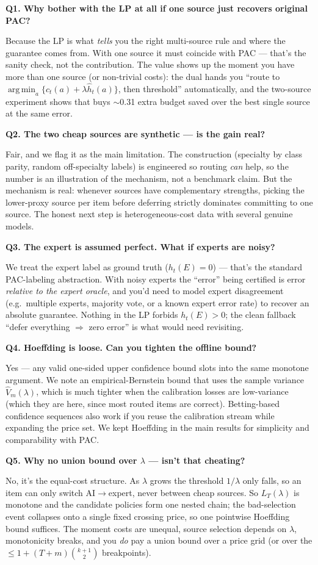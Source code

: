 \documentclass[11pt]{article}
\newcommand{\argmin}{\operatorname*{arg\,min}}
\newcommand{\hath}{\widehat h}
\newcommand{\qsection}[1]{%
  \par\vspace{0.7\baselineskip}%
  {\large\bfseries\color{blue!45!black}#1}\par
  \vspace{0.2\baselineskip}}
\begin{document}
\qsection{Q1. Why bother with the LP at all if one source just recovers original PAC?}
Because the LP is what \emph{tells} you the right multi-source rule and where the
guarantee comes from. With one source it must coincide with PAC --- that's the
sanity check, not the contribution. The value shows up the moment you have more
than one source (or non-trivial costs): the dual hands you ``route to
$\argmin_a\{c_t(a)+\lambda\hath_t(a)\}$, then threshold'' automatically, and the
two-source experiment shows that buys $\sim$0.31 extra budget saved over the best
single source at the same error.

\qsection{Q2. The two cheap sources are synthetic --- is the gain real?}
Fair, and we flag it as the main limitation. The construction (specialty by
class parity, random off-specialty labels) is engineered so routing \emph{can}
help, so the number is an illustration of the mechanism, not a benchmark claim.
But the mechanism is real: whenever sources have complementary strengths, picking
the lower-proxy source per item before deferring strictly dominates committing to
one source. The honest next step is heterogeneous-cost data with several genuine
models.

\qsection{Q3. The expert is assumed perfect. What if experts are noisy?}
We treat the expert label as ground truth ($h_t(E)=0$) --- that's the standard
PAC-labeling abstraction. With noisy experts the ``error'' being certified is
error \emph{relative to the expert oracle}, and you'd need to model expert
disagreement (e.g.\ multiple experts, majority vote, or a known expert error
rate) to recover an absolute guarantee. Nothing in the LP forbids $h_t(E)>0$;
the clean fallback ``defer everything $\Rightarrow$ zero error'' is what would
need revisiting.

\qsection{Q4. Hoeffding is loose. Can you tighten the offline bound?}
Yes --- any valid one-sided upper confidence bound slots into the same monotone
argument. We note an empirical-Bernstein bound that uses the sample variance
$\widehat V_m(\lambda)$, which is much tighter when the calibration losses are
low-variance (which they are here, since most routed items are correct).
Betting-based confidence sequences also work if you reuse the calibration stream
while expanding the price set. We kept Hoeffding in the main results for
simplicity and comparability with PAC.

\qsection{Q5. Why no union bound over $\lambda$ --- isn't that cheating?}
No, it's the equal-cost structure. As $\lambda$ grows the threshold $1/\lambda$
only falls, so an item can only switch AI$\to$expert, never between cheap
sources. So $L_T(\lambda)$ is monotone and the candidate policies form one nested
chain; the bad-selection event collapses onto a single fixed crossing price, so
one pointwise Hoeffding bound suffices. The moment costs are unequal, source
selection depends on $\lambda$, monotonicity breaks, and you \emph{do} pay a
union bound over a price grid (or over the $\le1+(T+m)\binom{k+1}{2}$ breakpoints).
\end{document}
